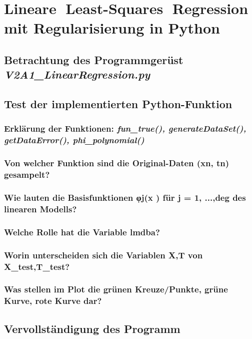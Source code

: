 \section{Lineare Least-Squares Regression mit Regularisierung in Python}


\subsection{
    Betrachtung des Programmgerüst \textit{V2A1_LinearRegression.py}
}



\subsection{
    Test der implementierten Python-Funktion
}

\subsubsection{Erklärung der Funktionen: \textit{fun_true(), generateDataSet(), getDataError(), phi_polynomial()}}

\subsubsection{Von welcher Funktion sind die Original-Daten (xn, tn) gesampelt?}

\subsubsection{Wie lauten die Basisfunktionen φj(x ) für j = 1, ...,deg des linearen Modells?}

\subsubsection{Welche Rolle hat die Variable lmdba?}

\subsubsection{Worin unterscheiden sich die Variablen X,T von X_test,T_test?}

\subsubsection{Was stellen im Plot die grünen Kreuze/Punkte, grüne Kurve, rote Kurve dar?}

\subsection{
    Vervollständigung des Programm
}

